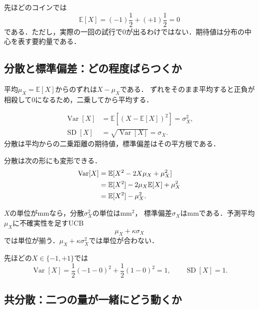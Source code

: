 \documentclass[a4paper,11pt]{ltjsarticle}
\newcommand{\E}{\mathbb E}
\newcommand{\Var}{\operatorname{Var}}
\begin{document}
先ほどのコインでは
\begin{equation}
  \E[X]=(-1)\frac12+(+1)\frac12=0
\end{equation}
である．ただし，実際の一回の試行で0が出るわけではない．期待値は分布の中心を表す要約量である．

\subsection{分散と標準偏差：どの程度ばらつくか}

平均\(\mu_X=\E[X]\)からのずれは\(X-\mu_X\)である．
ずれをそのまま平均すると正負が相殺して0になるため，二乗してから平均する．
\begin{definitionbox}[分散と標準偏差]
\begin{align}
  \Var[X]
  &=\E\left[(X-\E[X])^2\right]
  =\sigma_X^2,
  \label{eq:variance-definition}\\
  \operatorname{SD}[X]
  &=\sqrt{\Var[X]}=\sigma_X.
  \label{eq:sd-definition}
\end{align}
分散は平均からの二乗距離の期待値，標準偏差はその平方根である．
\end{definitionbox}

分散は次の形にも変形できる．
\begin{align}
  \Var[X]
  &=\E[X^2-2X\mu_X+\mu_X^2]\notag\\
  &=\E[X^2]-2\mu_X\E[X]+\mu_X^2\notag\\
  &=\E[X^2]-\mu_X^2.
  \label{eq:variance-second-moment}
\end{align}

\begin{intuitionbox}[なぜUCBでは分散でなく標準偏差か]
\(X\)の単位がmmなら，分散\(\sigma_X^2\)の単位は\(\mathrm{mm}^2\)，
標準偏差\(\sigma_X\)はmmである．予測平均\(\mu_X\)に不確実性を足すUCB
\begin{equation*}
  \mu_X+\kappa\sigma_X
\end{equation*}
では単位が揃う．\(\mu_X+\kappa\sigma_X^2\)では単位が合わない．
\end{intuitionbox}

先ほどの\(X\in\{-1,+1\}\)では
\begin{equation}
  \Var[X]
  =\frac12(-1-0)^2+\frac12(1-0)^2=1,
  \qquad \operatorname{SD}[X]=1.
\end{equation}

\subsection{共分散：二つの量が一緒にどう動くか}
\end{document}
